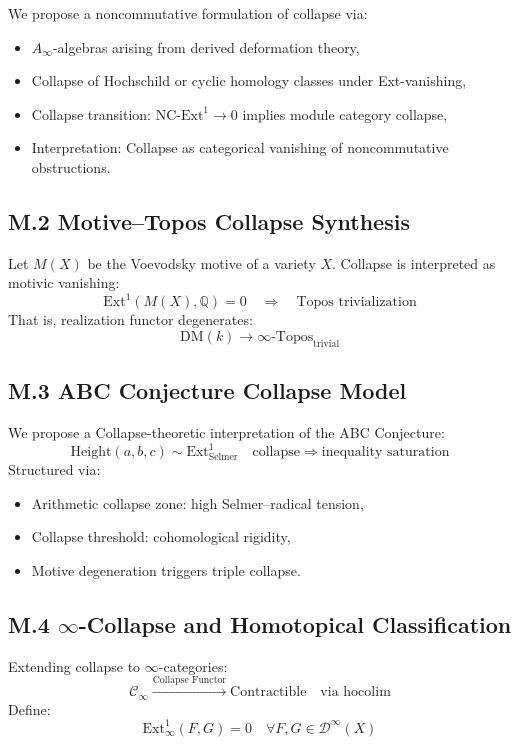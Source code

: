 \documentclass[11pt]{article}
\begin{document}
\begin{axiom}
\begin{axiom}
{{We propose a noncommutative formulation of collapse via:
\begin{itemize}
  \item $A_\infty$-algebras arising from derived deformation theory,
  \item Collapse of Hochschild or cyclic homology classes under Ext-vanishing,
  \item Collapse transition: $\mathrm{NC\text{-}Ext}^1 \to 0$ implies module category collapse,
  \item Interpretation: Collapse as categorical vanishing of noncommutative obstructions.
\end{itemize}

\subsection*{M.2 Motive–Topos Collapse Synthesis}

Let $M(X)$ be the Voevodsky motive of a variety $X$.  
Collapse is interpreted as motivic vanishing:
\[
\mathrm{Ext}^1(M(X), \mathbb{Q}) = 0 \quad \Rightarrow \quad \text{Topos trivialization}
\]
That is, realization functor degenerates:
\[
\mathrm{DM}(k) \to \infty\text{-Topos}_{\text{trivial}}
\]

\subsection*{M.3 ABC Conjecture Collapse Model}

We propose a Collapse-theoretic interpretation of the ABC Conjecture:
\[
\text{Height}(a,b,c) \sim \mathrm{Ext}^1_{\text{Selmer}} \quad \text{collapse} \Rightarrow \text{inequality saturation}
\]
Structured via:
\begin{itemize}
  \item Arithmetic collapse zone: high Selmer–radical tension,
  \item Collapse threshold: cohomological rigidity,
  \item Motive degeneration triggers triple collapse.
\end{itemize}

\subsection*{M.4 $\infty$-Collapse and Homotopical Classification}

Extending collapse to $\infty$-categories:
\[
\mathcal{C}_\infty \xrightarrow{\text{Collapse Functor}} \text{Contractible} \quad \text{via } \mathrm{hocolim}
\]
Define:
\[
\mathrm{Ext}^1_\infty(F,G) = 0 \quad \forall F,G \in \mathcal{D}^\infty(X)
\]

}}
\end{axiom}
\end{axiom}
\end{document}
